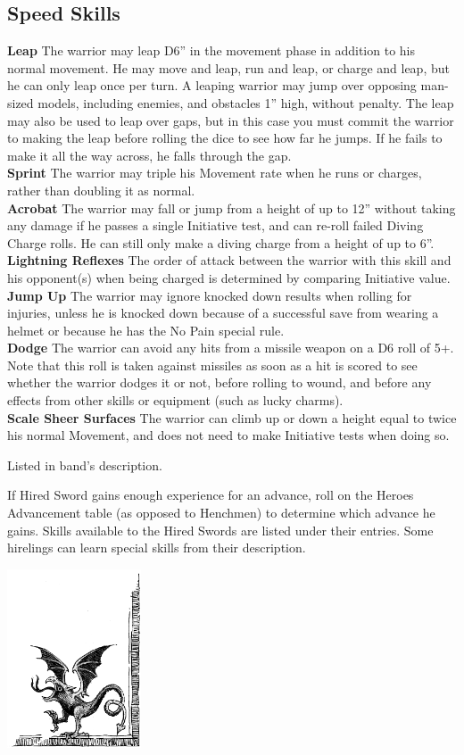 \subsection*{Speed Skills}
\textbf{Leap} The warrior may leap D6” in the movement phase in addition to his normal movement. He may move and leap, run and leap, or charge and leap, but he can only leap once per turn. A leaping warrior may jump over opposing man-sized models, including enemies, and obstacles 1” high, without penalty. The leap may also be used to leap over gaps, but in this case you must commit the warrior to making the leap before rolling the dice to see how far he jumps. If he fails to make it all the way across, he falls through the gap. \\
\textbf{Sprint} The warrior may triple his Movement rate when he runs or charges, rather than doubling it as normal. \\
\textbf{Acrobat} The warrior may fall or jump from a height of up to 12” without taking any damage if he passes a single Initiative test, and can re-roll failed Diving Charge rolls. He can still only make a diving charge from a height of up to 6”. \\
\textbf{Lightning Reflexes} The order of attack between the warrior with this skill and his opponent(s) when being charged is determined by comparing Initiative value. \\
\textbf{Jump Up} The warrior may ignore knocked down results when rolling for injuries, unless he is knocked down because of a successful save from wearing a helmet or because he has the No Pain special rule. \\
\textbf{Dodge} The warrior can avoid any hits from a missile weapon on a D6 roll of 5+. Note that this roll is taken against missiles as soon as a hit is scored to see whether the warrior dodges it or not, before rolling to wound, and before any effects from other skills or equipment (such as lucky charms). \\
\textbf{Scale Sheer Surfaces} The warrior can climb up or down a height equal to twice his normal Movement, and does not need to make Initiative tests when doing so.

Listed in band's description.

If Hired Sword gains enough experience for
an advance, roll on the Heroes Advancement table (as
opposed to Henchmen) to determine which advance
he gains. Skills available to the Hired Swords are
listed under their entries. Some hirelings can learn special skills from their description.

\vspace*{-1cm}\hspace*{2.1cm}\includegraphics[height=5.3cm]{corner}